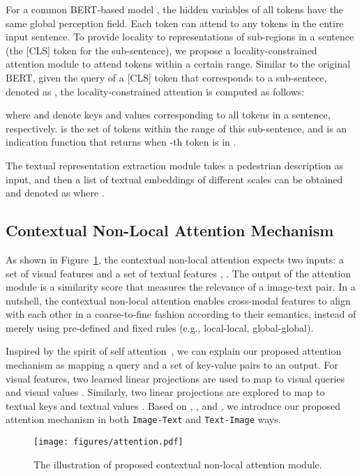 \documentclass[final]{cvpr}
\begin{document}
For a common BERT-based model \cite{devlin2018bert}, the hidden variables of all tokens have the same global perception field. Each token can attend to any tokens in the entire input sentence. To provide locality to representations of sub-regions in a sentence (the [CLS] token for the sub-sentence), we propose a locality-constrained attention module to attend tokens within a certain range. Similar to the original BERT, given the query of a [CLS] token that corresponds to a sub-sentece, denoted as , the locality-constrained attention is computed as follows:

where  and  denote keys and values corresponding to all tokens in a sentence, respectively.  is the set of tokens within the range of this sub-sentence, and  is an indication function that returns  when -th token is in . 

The textual representation extraction module takes a pedestrian description as input, and then a list of textual embeddings of different scales can be obtained and denoted as  where .

\subsection{Contextual Non-Local Attention Mechanism}
As shown in Figure~\ref{fig_attention}, the contextual non-local attention expects two inputs: a set of visual features  and a set of textual features , . The output of the attention module is a similarity score that measures the relevance of a image-text pair. In a nutshell, the contextual non-local attention enables cross-modal features to align with each other in a coarse-to-fine fashion according to their semantics, instead of merely using pre-defined and fixed rules (e.g., local-local, global-global).

Inspired by the spirit of self attention~\cite{vaswani2017attention}, we can explain our proposed attention mechanism as mapping a query and a set of key-value pairs to an output. 
For visual features, two learned linear projections are used to map  to visual queries  and visual values . Similarly, two linear projections are explored to map  to textual keys  and textual values . 
Based on , ,  and , we introduce our proposed attention mechanism in both \texttt{Image-Text} and \texttt{Text-Image} ways.

\begin{figure}
    \centering
    \texttt{[image: figures/attention.pdf]}
    \caption{The illustration of proposed contextual non-local attention module. }
    \label{fig_attention}
\end{figure}
\end{document}
